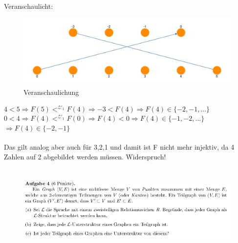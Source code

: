 \documentclass[a4paper]{scrartcl}
\begin{document}
\begin{itemize}
            \\Veranschaulicht:\\
            \begin{figure}[H]
                \centering
                \includegraphics[scale=0.3]{./3-b-drawing.pdf}
                \caption{Veranschaulichung}
                \label{fig:name}
            \end{figure}

            $4 < 5 \Rightarrow F(5) <^{\mathscr{Z'}_1} F(4) \Rightarrow -3 < F(4) \Rightarrow F(4) \in \{-2,-1,...\}$\\
            $0 < 4 \Rightarrow F(4) <^{\mathscr{Z'}_1} F(0) \Rightarrow F(4) < 0 \Rightarrow F(4) \in \{-1,-2,...\}$\\
            $\Rightarrow F(4) \in \{-2,-1\}$\\
            \\Das gilt analog aber auch für 3,2,1 und damit ist F nicht mehr injektiv, da 4 Zahlen auf 2 abgebildet werden müssen.
            Widerspruch!

    \end{itemize}

\newpage

\section*{}%
\label{sec:aufgabe_4}

\begin{figure}[H]
    \centering
    \includegraphics[scale=0.6]{./A-4.png}
    \label{fig:}
\end{figure}
\end{document}
